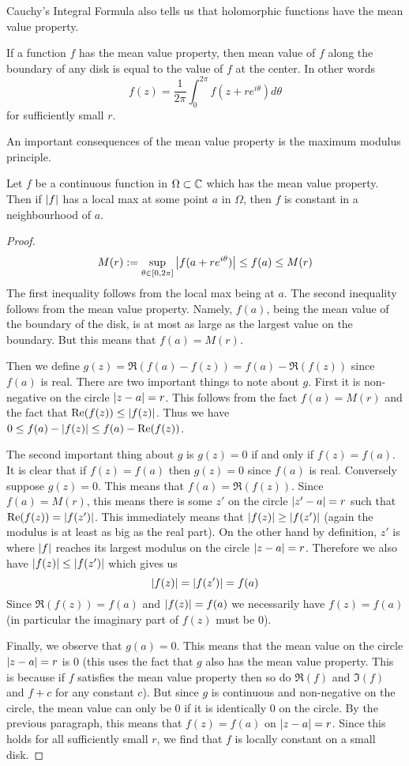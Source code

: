 Cauchy's Integral Formula also tells us that holomorphic functions have the mean value property. 
\begin{definition}
If a function $f$ has the mean value property, then mean value of $f$ along the boundary of any disk is equal to the value of $f$ at the center. In other words
$$f(z) = \frac{1}{2\pi} \int_{0}^{2\pi} f(z + re^{i\theta}) d\theta$$
for sufficiently small $r$.
\end{definition}

An important consequences of the mean value property is the maximum modulus principle.
\begin{lemma}
Let $f$ be a continuous function in $\Omega \subset \mathbb{C}$ which has the mean value property. Then if $\left|f\right|$ has a local max at some point $a$ in $\Omega$, then $f$ is constant in a neighbourhood of $a$.
\end{lemma}
\begin{proof}
$$ M(r) := \sup_{\theta \in [0, 2\pi]} \left|f(a + re^{i\theta})\right| \leq f(a) \leq M(r) $$
The first inequality follows from the local max being at $a$. The second inequality follows from the mean value property. Namely, $f(a)$, being the mean value of the boundary of the disk, is at most as large as the largest value on the boundary. But this means that $f(a) = M(r)$. 

Then we define $g(z) = \Re(f(a) - f(z)) = f(a) - \Re(f(z))$ since $f(a)$ is real. There are two important things to note about $g$. First it is non-negative on the circle $\left|z - a\right| = r$. This follows from the fact $f(a) = M(r)$ and the fact that $\text{Re}(f(z)) \leq \left|f(z)\right|$. 
Thus we have $0 \leq f(a) - \left|f(z)\right| \leq f(a) - \text{Re}(f(z))$.

The second important thing about $g$ is $g(z) = 0$ if and only if $f(z) = f(a)$. It is clear that if $f(z) = f(a)$ then $g(z) = 0$ since $f(a)$ is real. Conversely suppose $g(z) = 0$. This means that $f(a) = \Re(f(z))$. Since $f(a) = M(r)$, this means there is some $z'$ on the circle $\left|z' - a\right| = r$ such that $\text{Re}(f(z)) = \left|f(z')\right|$. This immediately means that $\left|f(z)\right| \geq \left|f(z')\right|$ (again the modulus is at least as big as the real part). On the other hand by definition, $z'$ is where $\left|f\right|$ reaches its largest modulus on the circle $\left|z - a\right| = r$. Therefore we also have $\left|f(z)\right| \leq \left|f(z')\right|$ which gives us
$$\left|f(z)\right| = \left|f(z')\right| = f(a)$$
Since $\Re(f(z)) = f(a)$ and $\left|f(z)\right| = f(a)$ we necessarily have $f(z) = f(a)$ (in particular the imaginary part of $f(z)$ must be 0).

Finally, we observe that $g(a) = 0$. This means that the mean value on the circle $\left|z - a\right| = r$ is 0 (this uses the fact that $g$ also has the mean value property. This is because if $f$ satisfies the mean value property then so do $\Re(f)$ and $\Im(f)$ and $f + c$ for any constant $c$). But since $g$ is continuous and non-negative on the circle, the mean value can only be 0 if it is identically 0 on the circle. By the previous paragraph, this means that $f(z) = f(a)$ on $\left|z - a\right| = r$. Since this holds for all sufficiently small $r$, we find that $f$ is locally constant on a small disk.
\end{proof}
